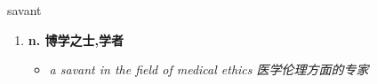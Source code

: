 
\begin{frame}
{\huge savant}
\begin{center}
\begin{enumerate}\Large
  \item \textbf{n. 博学之士,学者}
  \begin{itemize}
    \item \em{\Large{a savant in the field of medical ethics 医学伦理方面的专家}}
  \end{itemize}
\end{enumerate}
\end{center}
\end{frame}
